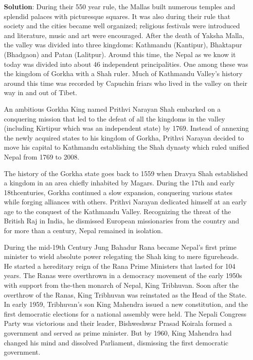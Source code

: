 \documentclass[
  openany]{book}
\newenvironment{solution}{ {\bfseries Solution}:}{}
\begin{document}
\begin{questions}
\begin{solution}
During their 550 year rule, the Mallas built numerous temples and splendid palaces with picturesque squares. It was also during their rule that society and the cities became well organized; religious festivals were introduced and literature, music and art were encouraged. After the death of Yaksha Malla, the valley was divided into three kingdoms: Kathmandu (Kantipur), Bhaktapur (Bhadgaon) and Patan (Lalitpur). Around this time, the Nepal as we know it today was divided into about 46 independent principalities. One among these was the kingdom of Gorkha with a Shah ruler. Much of Kathmandu Valley’s history around this time was recorded by Capuchin friars who lived in the valley on their way in and out of Tibet.

An ambitious Gorkha King named Prithvi Narayan Shah embarked on a conquering mission that led to the defeat of all the kingdoms in the valley (including Kirtipur which was an independent state) by 1769. Instead of annexing the newly acquired states to his kingdom of Gorkha, Prithvi Narayan decided to move his capital to Kathmandu establishing the Shah dynasty which ruled unified Nepal from 1769 to 2008.

The history of the Gorkha state goes back to 1559 when Dravya Shah established a kingdom in an area chiefly inhabited by Magars. During the 17th and early 18thcenturies, Gorkha continued a slow expansion, conquering various states while forging alliances with others. Prithvi Narayan dedicated himself at an early age to the conquest of the Kathmandu Valley. Recognizing the threat of the British Raj in India, he dismissed European missionaries from the country and for more than a century, Nepal remained in isolation.

During the mid-19th Century Jung Bahadur Rana became Nepal’s first prime minister to wield absolute power relegating the Shah king to mere figureheads. He started a hereditary reign of the Rana Prime Ministers that lasted for 104 years. The Ranas were overthrown in a democracy movement of the early 1950s with support from the-then monarch of Nepal, King Tribhuvan. Soon after the overthrow of the Ranas, King Tribhuvan was reinstated as the Head of the State. In early 1959, Tribhuvan’s son King Mahendra issued a new constitution, and the first democratic elections for a national assembly were held. The Nepali Congress Party was victorious and their leader, Bishweshwar Prasad Koirala formed a government and served as prime minister. But by 1960, King Mahendra had changed his mind and dissolved Parliament, dismissing the first democratic government.


\end{solution}
\end{questions}
\end{document}

